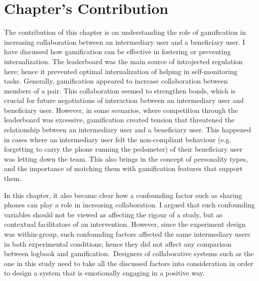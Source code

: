\section{Chapter's Contribution}
The contribution of this chapter is on understanding the role of gamification in increasing collaboration between an intermediary user and a beneficiary user. I have discussed how gamification can be effective in fostering or preventing internalization. The leaderboard was the main source of introjected regulation here; hence it prevented optimal internalization of helping in self-monitoring tasks. Generally, gamification appeared to increase collaboration between members of a pair. This collaboration seemed to strengthen bonds, which is crucial for future negotiations of interaction between an intermediary user and beneficiary user. However, in some scenarios, where competition through the leaderboard was excessive, gamification created tension that threatened the relationship between an intermediary user and a beneficiary user. This happened in cases where an intermediary user felt the non-compliant behaviour (e.g. forgetting to carry the phone running the pedometer) of their beneficiary user was letting down the team.  This also brings in the concept of personality types, and the importance of matching them with gamification features that support them.

In this chapter, it also became clear how a confounding factor such as sharing phones can play a role in increasing collaboration. I argued that such confounding variables should not be viewed as affecting the rigour of a study, but as contextual facilitators of an intervention. However, since the experiment design was within-group, such confounding factors affected the same intermediary users in both experimental conditions; hence they did not affect any comparison between logbook and gamification.~Designers of collaborative systems such as the one in this study need to take all the discussed factors into consideration in order to design a system that is emotionally engaging in a positive way.
\begin{flushright}
\end{flushright}

